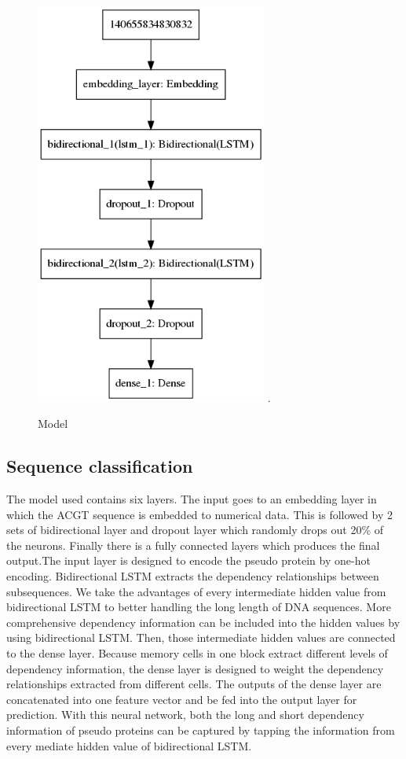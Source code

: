 \documentclass[conference]{IEEEtran}
\begin{document}
\begin{figure}[h]
\centering
\includegraphics[width=3in]{model.png}
\DeclareGraphicsExtensions.
\caption{Model}
\label{fig_sim}
\end{figure}

\subsection{Sequence classification}
The  model used contains six layers. The input goes to an embedding layer in which the ACGT sequence is embedded to numerical data. This is followed by 2 sets of bidirectional layer and dropout layer which randomly drops out 20\% of the neurons. Finally there is a fully connected layers which produces the final output.The input layer is designed to encode the pseudo protein by one-hot encoding. Bidirectional LSTM extracts the dependency relationships between subsequences. We take the advantages of every intermediate hidden value from bidirectional LSTM to better handling the long
length of DNA sequences. More comprehensive dependency information can be included into the hidden values by using bidirectional LSTM. Then, those intermediate hidden values are connected to the  dense layer. Because memory cells in one block
extract different levels of dependency information, the  dense layer is designed to weight the dependency relationships extracted from different cells. The outputs of the dense layer are concatenated into one feature vector and be fed into the
output layer for prediction.\newline
With this neural network, both the long and short dependency information of pseudo proteins can be captured by tapping the information from every mediate hidden value of bidirectional LSTM.
\newline
\end{document}
